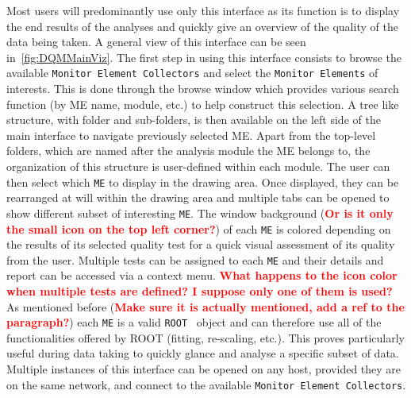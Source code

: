 \documentclass{webofc}
\begin{document}
Most users will predominantly use only this interface as its function is to display the end results of the analyses and quickly give an overview of the quality of the data being taken.
A general view of this interface can be seen in~\autoref{fig:DQMMainViz}.
The first step in using this interface consists to browse the available \texttt{Monitor Element Collectors} and select the \texttt{Monitor Elements} of interests.
This is done through the browse window which provides various search function (by ME name, module, etc.) to help construct this selection.
A tree like structure, with folder and sub-folders, is then available on the left side of the main interface to navigate previously selected ME.
Apart from the top-level folders, which are named after the analysis module the ME belongs to, the organization of this structure is user-defined within each module. 
The user can then select which \texttt{ME} to display in the drawing area. Once displayed, they can be rearranged at will within the drawing area and multiple tabs can be opened to show different subset of interesting \texttt{ME}. 
The window background (\textcolor{red}{\textbf{Or is it only the small icon on the top left corner?}}) of each \texttt{ME} is colored depending on the results of its selected quality test for a quick visual assessment of its quality from the user.
Multiple tests can be assigned to each \texttt{ME} and their details and report can be accessed via a context menu. \textcolor{red}{\textbf{What happens to the icon color when multiple tests are defined? I suppose only one of them is used?}}
As mentioned before (\textcolor{red}{\textbf{Make sure it is actually mentioned, add a ref to the paragraph?}}) each \texttt{ME} is a valid \texttt{ROOT}~\cite{ROOT} object and can therefore use all of the functionalities offered by ROOT (fitting, re-scaling, etc.).
This proves particularly useful during data taking to quickly glance and analyse a specific subset of data. 
Multiple instances of this interface can be opened on any host, provided they are on the same network, and connect to the available \texttt{Monitor Element Collectors}. 
\end{document}
